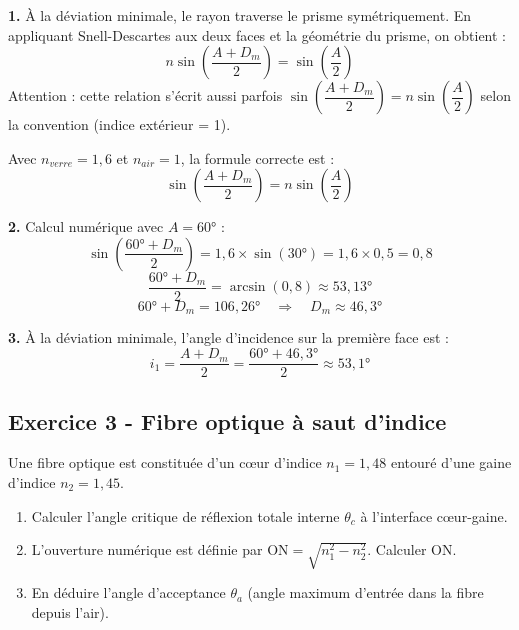 \documentclass[12pt,a4paper]{article}
\begin{document}
\begin{boitecorrige}
\textbf{1.} À la déviation minimale, le rayon traverse le prisme symétriquement. En appliquant Snell-Descartes aux deux faces et la géométrie du prisme, on obtient :
\[
n\sin\!\left(\frac{A+D_m}{2}\right) = \sin\!\left(\frac{A}{2}\right)
\]
Attention : cette relation s'écrit aussi parfois $\sin\!\left(\dfrac{A+D_m}{2}\right) = n\sin\!\left(\dfrac{A}{2}\right)$ selon la convention (indice extérieur = 1).

Avec $n_{verre}=1{,}6$ et $n_{air}=1$, la formule correcte est :
\[
\sin\!\left(\frac{A+D_m}{2}\right) = n\sin\!\left(\frac{A}{2}\right)
\]

\textbf{2.} Calcul numérique avec $A = 60°$ :
\[
\sin\!\left(\frac{60°+D_m}{2}\right) = 1{,}6 \times \sin(30°) = 1{,}6 \times 0{,}5 = 0{,}8
\]
\[
\frac{60°+D_m}{2} = \arcsin(0{,}8) \approx 53{,}13°
\]
\[
60° + D_m = 106{,}26° \quad \Rightarrow \quad \boxed{D_m \approx 46{,}3°}
\]

\textbf{3.} À la déviation minimale, l'angle d'incidence sur la première face est :
\[
i_1 = \frac{A + D_m}{2} = \frac{60° + 46{,}3°}{2} \approx 53{,}1°
\]
\end{boitecorrige}

\subsection*{Exercice 3 - Fibre optique à saut d'indice \niveau{\moyen}}

\begin{boiteexercice}
Une fibre optique est constituée d'un c\oe{}ur d'indice $n_1 = 1{,}48$ entouré d'une gaine d'indice $n_2 = 1{,}45$.
\begin{enumerate}
  \item Calculer l'angle critique de réflexion totale interne $\theta_c$ à l'interface c\oe{}ur-gaine.
  \item L'ouverture numérique est définie par $\text{ON} = \sqrt{n_1^2 - n_2^2}$. Calculer ON.
  \item En déduire l'angle d'acceptance $\theta_a$ (angle maximum d'entrée dans la fibre depuis l'air).
\end{enumerate}
\end{boiteexercice}
\end{document}
